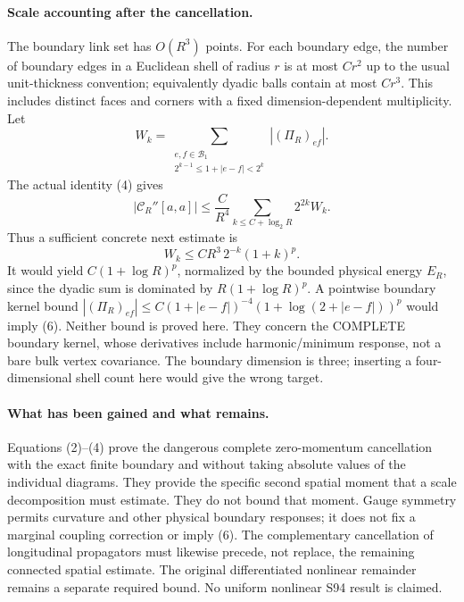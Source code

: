 \documentclass[11pt]{article}
\begin{document}
\paragraph{Scale accounting after the cancellation.}
The boundary link set has $O(R^3)$ points. For each boundary edge, the
number of boundary edges in a Euclidean shell of radius $r$ is at most
$Cr^2$ up to the usual unit-thickness convention; equivalently dyadic
balls contain at most $Cr^3$. This includes distinct faces and corners
with a fixed dimension-dependent multiplicity. Let
\[
 W_k=\sum_{\substack{e,f\in\mathcal B_1\\
                 2^{k-1}\le1+|e-f|<2^k}}|(\Pi_R)_{ef}|.
\]
The actual identity (4) gives
\[
 |\mathcal C_R''[a,a]|
       \le \frac{C}{R^4}\sum_{k\le C+\log_2R}2^{2k}W_k.           \tag{5}
\]
Thus a sufficient concrete next estimate is
\[
 W_k\le C R^3\,2^{-k}(1+k)^p.                                   \tag{6}
\]
It would yield $C(1+\log R)^p$, normalized by the bounded physical
energy $E_R$, since the dyadic sum is dominated by $R(1+\log R)^p$.
A pointwise boundary kernel bound
$|(\Pi_R)_{ef}|\le C(1+|e-f|)^{-4}
 (1+\log(2+|e-f|))^p$ would imply (6).
Neither bound is proved here. They concern the COMPLETE boundary kernel,
whose derivatives include harmonic/minimum response, not a bare bulk
vertex covariance. The boundary dimension is three; inserting a
four-dimensional shell count here would give the wrong target.

\paragraph{What has been gained and what remains.}
Equations (2)--(4) prove the dangerous complete zero-momentum
cancellation with the exact finite boundary and without taking
absolute values of the individual diagrams. They provide the
specific second spatial moment that a scale decomposition must
estimate. They do not bound that moment. Gauge symmetry permits
curvature and other physical boundary responses; it does not fix a
marginal coupling correction or imply (6). The complementary cancellation
of longitudinal propagators must
likewise precede, not replace, the remaining connected spatial estimate.
The original differentiated nonlinear remainder remains a separate
required bound. No uniform nonlinear S94 result is claimed.
\end{document}
